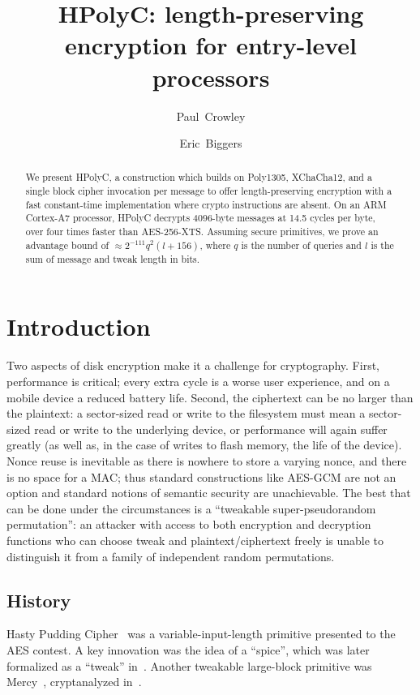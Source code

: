 \documentclass[letterpaper,luatex,11pt]{article}
\title{HPolyC: length-preserving encryption for entry-level processors}
\author{Paul~Crowley}
\author{Eric~Biggers}
\affil{Google LLC\\ \href{mailto:paulcrowley@google.com,ebiggers@google.com}{\{paulcrowley,ebiggers\}@google.com}}
\begin{document}
\maketitle

\begin{abstract}
    We present HPolyC, a construction which builds on Poly1305, XChaCha12, and a
    single block cipher invocation per message to offer length-preserving
    encryption with a fast constant-time implementation where crypto
    instructions are absent.  On an ARM Cortex-A7 processor, HPolyC decrypts
    4096-byte messages at 14.5 cycles per byte, over four times faster than
    AES-256-XTS.
    Assuming secure primitives, we prove an advantage bound of
    $\approx 2^{-111}q^2(l + 156)$,
    where $q$ is the number of queries and $l$ is the sum of message and tweak length in bits.
\end{abstract}

\section{Introduction}
Two aspects of disk encryption make it a challenge for cryptography.  First,
performance is critical; every extra cycle is a worse user experience, and on a mobile device
a reduced battery life.  Second, the ciphertext can be no larger than the plaintext: a sector-sized
read or write to the filesystem must mean a sector-sized read or write to the underlying device,
or performance will again suffer greatly
(as well as, in the case of writes to flash memory, the life of the device).
Nonce reuse is inevitable as there is nowhere to store a varying nonce, and there is no space
for a MAC; thus standard constructions like AES-GCM are not an option and standard notions
of semantic security are unachievable.  The best that can be done under the circumstances is
a ``tweakable super-pseudorandom permutation'': an attacker with access to both encryption
and decryption functions who can choose tweak and plaintext/ciphertext freely is unable to
distinguish it from a family of independent random permutations.

\subsection{History}

Hasty Pudding Cipher~\cite{hpc} was a variable-input-length primitive presented to the AES contest.
A key innovation
was the idea of a ``spice'', which was later formalized as a ``tweak'' in~\cite{tweakable}.
Another tweakable large-block primitive was Mercy~\cite{mercy},
cryptanalyzed in~\cite{mercycryptanalysis}.
\end{document}
